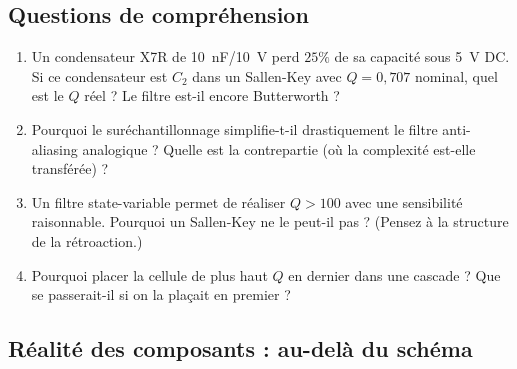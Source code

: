 \documentclass[12pt,a4paper,twoside]{book}
\begin{document}
\subsection*{Questions de compréhension}

\begin{enumerate}[nosep]
\item Un condensateur X7R de \SI{10}{nF}/\SI{10}{V} perd $25\%$ de sa capacité sous \SI{5}{V} DC. Si ce condensateur est $C_2$ dans un Sallen-Key avec $Q = 0{,}707$ nominal, quel est le $Q$ réel ? Le filtre est-il encore Butterworth ?
\item Pourquoi le suréchantillonnage simplifie-t-il drastiquement le filtre anti-aliasing analogique ? Quelle est la contrepartie (où la complexité est-elle transférée) ?
\item Un filtre state-variable permet de réaliser $Q > 100$ avec une sensibilité raisonnable. Pourquoi un Sallen-Key ne le peut-il pas ? (Pensez à la structure de la rétroaction.)
\item Pourquoi placer la cellule de plus haut $Q$ en dernier dans une cascade ? Que se passerait-il si on la plaçait en premier ?
\end{enumerate}

\subsection*{Réalité des composants : au-delà du schéma}
\end{document}
